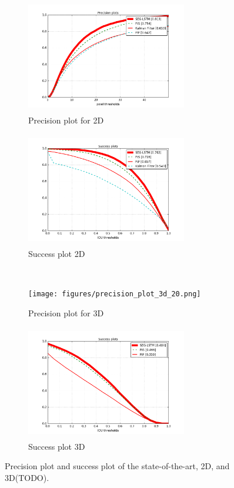 \documentclass[10pt,twocolumn,letterpaper]{article}
\begin{document}
\begin{figure}[t]
   \centering
    \begin{subfigure}[c]{0.4\textwidth}
    \centering
    \includegraphics[width=7cm,height=5cm, clip]{figures/precision_plot_2d.png}
    \caption{\small{Precision plot for 2D}}
    \end{subfigure}%
    \begin{subfigure}[c]{0.4\textwidth}
    \centering
        \includegraphics[width=7cm,height=5cm, clip]{figures/success_plot_2d.png}
        \caption{\small{Success plot 2D}}
    \end{subfigure}
    \\
     \begin{subfigure}[c]{0.4\textwidth}
     \texttt{[image: figures/precision\_plot\_3d\_20.png]}
    \caption{\small{Precision plot for 3D}}
    \end{subfigure}%
    \begin{subfigure}[c]{0.4\textwidth}
    \centering
        \includegraphics[width=7cm,height=5cm, clip]{figures/success_plot_3d.png}
        \caption{\small{Success plot 3D}}
    \end{subfigure}
\caption{Precision plot and success plot of the state-of-the-art, 2D, and 3D(TODO).
}
\label{fig:precision_plot_and_success_plot_OBT100}
\end{figure}
\end{document}

